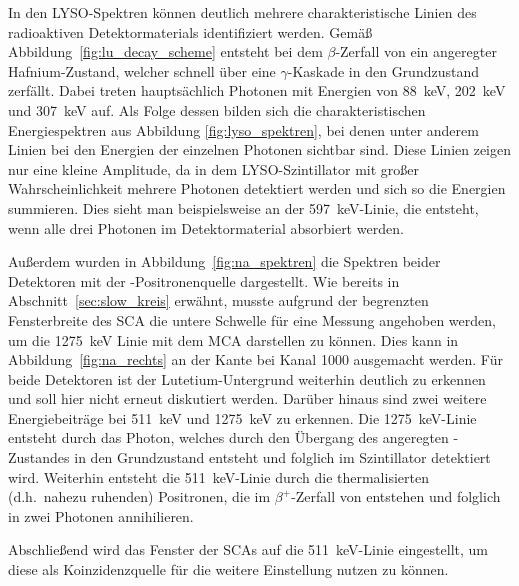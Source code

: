 \documentclass[11pt, a4paper]{article}
\numberwithin{equation}{section}
\begin{document}
In den LYSO-Spektren können deutlich mehrere charakteristische Linien des radioaktiven Detektormaterials identifiziert werden.
Gemäß Abbildung~\ref{fig:lu_decay_scheme} entsteht bei dem $\beta$-Zerfall von  ein angeregter Hafnium-Zustand, welcher schnell über eine $\gamma$-Kaskade in den Grundzustand zerfällt.
Dabei treten hauptsächlich Photonen mit Energien von \SI{88}{\keV}, \SI{202}{\keV} und \SI{307}{\keV} auf.
Als Folge dessen bilden sich die charakteristischen Energiespektren aus Abbildung \ref{fig:lyso_spektren}, bei denen unter anderem Linien bei den Energien der einzelnen Photonen sichtbar sind.
Diese Linien zeigen nur eine kleine Amplitude, da in dem LYSO-Szintillator mit großer Wahrscheinlichkeit mehrere Photonen detektiert werden und sich so die Energien summieren.
Dies sieht man beispielsweise an der \SI{597}{\keV}-Linie, die entsteht, wenn alle drei Photonen im Detektormaterial absorbiert werden.

Außerdem wurden in Abbildung~\ref{fig:na_spektren} die Spektren beider Detektoren mit der -Positronenquelle dargestellt.
Wie bereits in Abschnitt~\ref{sec:slow_kreis} erwähnt, musste aufgrund der begrenzten Fensterbreite des SCA die untere Schwelle für eine Messung angehoben werden, um die \SI{1275}{\keV} Linie mit dem MCA darstellen zu können.
Dies kann in Abbildung~\ref{fig:na_rechts} an der Kante bei Kanal 1000 ausgemacht werden.
Für beide Detektoren ist der Lutetium-Untergrund weiterhin deutlich zu erkennen und soll hier nicht erneut diskutiert werden.
Darüber hinaus sind zwei weitere Energiebeiträge bei \SI{511}{\keV} und \SI{1275}{\keV} zu erkennen.
Die \SI{1275}{\keV}-Linie entsteht durch das Photon, welches durch den Übergang des angeregten -Zustandes in den Grundzustand entsteht und folglich im Szintillator detektiert wird.
Weiterhin entsteht die \SI{511}{\keV}-Linie durch die thermalisierten (d.h.\ nahezu ruhenden) Positronen, die im $\beta^+$-Zerfall von  entstehen und folglich in zwei Photonen annihilieren.

Abschließend wird das Fenster der SCAs auf die \SI{511}{keV}-Linie eingestellt, um diese als Koinzidenzquelle für die weitere Einstellung nutzen zu können.
\end{document}

